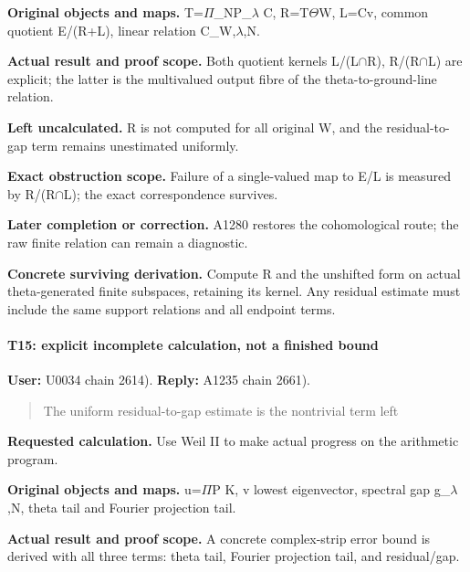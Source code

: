 \textbf{Original objects and maps.}
T=\allowbreak{}\ensuremath{Π}\allowbreak{}\_NP\_\allowbreak{}\ensuremath{λ}\allowbreak{}
C, R=T\allowbreak{}\ensuremath{Θ}\allowbreak{}W, L=Cv, common quotient
E/(R+L), linear relation
C\_W,\allowbreak{}\ensuremath{λ}\allowbreak{},N.

\textbf{Actual result and proof scope.} Both quotient kernels
L/(L\allowbreak{}\ensuremath{∩}\allowbreak{}R),
R/(R\allowbreak{}\ensuremath{∩}\allowbreak{}L) are explicit; the latter
is the multivalued output fibre of the theta-to-ground-line relation.

\textbf{Left uncalculated.} R is not computed for all original W, and
the residual-to-gap term remains unestimated uniformly.

\textbf{Exact obstruction scope.} Failure of a single-valued map to E/L
is measured by R/(R\allowbreak{}\ensuremath{∩}\allowbreak{}L); the exact
correspondence survives.

\textbf{Later completion or correction.} A1280 restores the
cohomological route; the raw finite relation can remain a diagnostic.

\textbf{Concrete surviving derivation.} Compute R and the unshifted form
on actual theta-generated finite subspaces, retaining its kernel. Any
residual estimate must include the same support relations and all
endpoint terms.

\paragraph{T15: explicit incomplete calculation, not a finished
bound}\label{t15-explicit-incomplete-calculation-not-a-finished-bound}

\textbf{User:} U0034
\protect{} chain 2614).
\textbf{Reply:} A1235
\protect{} chain 2661).

\begin{quote}
The uniform residual-to-gap estimate is the nontrivial term left
\end{quote}

\textbf{Requested calculation.} Use Weil II to make actual progress on
the arithmetic program.

\textbf{Original objects and maps.}
u=\allowbreak{}\ensuremath{Π}\allowbreak{}P K, v lowest eigenvector,
spectral gap g\_\allowbreak{}\ensuremath{λ}\allowbreak{},N, theta tail
and Fourier projection tail.

\textbf{Actual result and proof scope.} A concrete complex-strip error
bound is derived with all three terms: theta tail, Fourier projection
tail, and residual/gap.

